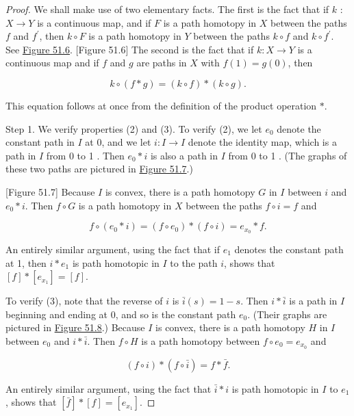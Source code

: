 \begin{proof}
We shall make use of two elementary facts. The first is the fact that if \(k\) : \(X \rightarrow Y\) is a continuous map, and if \(F\) is a path homotopy in \(X\) between the paths \(f\) and \(f^{\prime }\), then \(k \circ F\) is a path homotopy in \(Y\) between the paths \(k \circ f\) and \(k \circ {f}^{\prime }\). See \hyperref[fig:51.6]{Figure 51.6}.
[Figure 51.6]
The second is the fact that if \(k : X \rightarrow Y\) is a continuous map and if \(f\) and \(g\) are paths in \(X\) with \(f(1) = g( 0)\), then

\[
k \circ ( {f * g}) = ( {k \circ f}) * ( {k \circ g}).
\]

This equation follows at once from the definition of the product operation \(*\).

Step 1. We verify properties (2) and (3). To verify (2), we let \(e_{0}\) denote the constant path in \(I\) at 0, and we let \(i : I \rightarrow I\) denote the identity map, which is a path in \(I\) from 0 to 1 . Then \(e_{0} * i\) is also a path in \(I\) from 0 to 1 . (The graphs of these two paths are pictured in \hyperref[fig:51.7]{Figure 51.7}.)

[Figure 51.7]
Because \(I\) is convex, there is a path homotopy \(G\) in \(I\) between \(i\) and \(e_{0} * i\). Then \(f \circ G\) is a path homotopy in \(X\) between the paths \(f \circ i = f\) and

\[
f \circ ( {e_{0} * i}) = ( {f \circ {e}_{0}}) * ( {f \circ i}) = e_{x_{0}} * f.
\]

An entirely similar argument, using the fact that if \(e_{1}\) denotes the constant path at 1, then \(i * e_{1}\) is path homotopic in \(I\) to the path \(i\), shows that \([ f] * [ e_{x_{1}}] = [ f]\).

To verify (3), note that the reverse of \(i\) is \(\bar{i}( s) = 1 - s\). Then \(i * \bar{i}\) is a path in \(I\) beginning and ending at 0, and so is the constant path \(e_{0}\). (Their graphs are pictured in \hyperref[fig:51.8]{Figure 51.8}.) Because \(I\) is convex, there is a path homotopy \(H\) in \(I\) between \(e_{0}\) and \(i * \bar{i}\). Then \(f \circ H\) is a path homotopy between \(f \circ {e}_{0} = e_{x_{0}}\) and

\[
( {f \circ i}) * ( {f \circ \bar{i}}) = f * \bar{f}.
\]

An entirely similar argument, using the fact that \(\bar{i} * i\) is path homotopic in \(I\) to \(e_{1}\), shows that \([ \bar{f}] * [ f] = [ e_{x_{1}}]\).


\end{proof}
